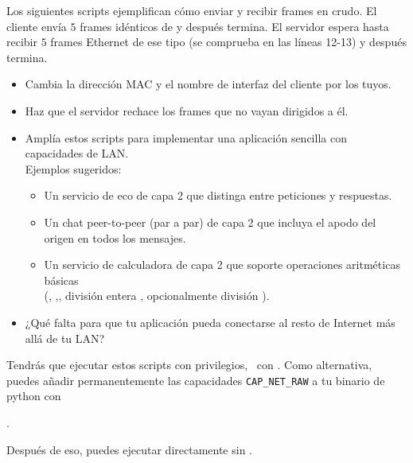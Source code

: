 \begin{exercise}
Los siguientes scripts ejemplifican cómo enviar y recibir frames  en crudo. 
El cliente envía $5$ frames idénticos de   y después termina.
El servidor espera hasta recibir $5$ frames Ethernet de ese tipo (se comprueba en las líneas 12-13) y después termina.
% 
\begin{itemize}
\item Cambia la dirección MAC y el nombre de interfaz del cliente por los tuyos.
\item Haz que el servidor rechace los frames que no vayan dirigidos a él.
\item Amplía estos scripts para implementar una aplicación sencilla con capacidades de LAN.\\
  Ejemplos sugeridos:
    \begin{itemize}
    \item Un servicio de eco de capa 2 que distinga entre peticiones y respuestas.
    \item Un chat peer-to-peer (par a par) de capa 2 que incluya el apodo del origen en todos los mensajes.
    \item Un servicio de calculadora de capa 2 que soporte operaciones aritméticas básicas\\
      (\inlineCode{+}, \inlineCode{-},\inlineCode{*}, división entera \inlineCode{//}, opcionalmente división \inlineCode{/}).
    \end{itemize}
\item ¿Qué falta para que tu aplicación pueda conectarse al resto de Internet más allá de tu LAN?
\end{itemize}

\label{ex:layer2:echo}
\end{exercise}

\vfill

\begin{center}
\end{center}

\begin{center}
\end{center}

\begin{remark}
Tendrás que ejecutar estos scripts con privilegios, \eg\ con .
% 
Como alternativa, puedes añadir permanentemente las capacidades \texttt{CAP\_NET\_RAW}
a tu binario de python con
\begin{center}
.  
\end{center}
% 
Después de eso, puedes ejecutar  directamente sin .\\[-0.5cm]
\end{remark}

